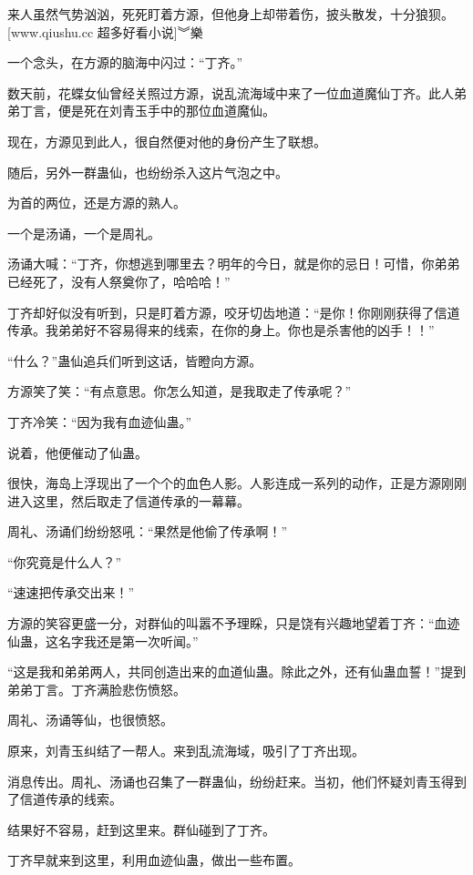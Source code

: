 
\begin{this_body}

来人虽然气势汹汹，死死盯着方源，但他身上却带着伤，披头散发，十分狼狈。[www.qiushu.cc 超多好看小说]︾樂

一个念头，在方源的脑海中闪过：“丁齐。”

数天前，花蝶女仙曾经关照过方源，说乱流海域中来了一位血道魔仙丁齐。此人弟弟丁言，便是死在刘青玉手中的那位血道魔仙。

现在，方源见到此人，很自然便对他的身份产生了联想。

随后，另外一群蛊仙，也纷纷杀入这片气泡之中。

为首的两位，还是方源的熟人。

一个是汤诵，一个是周礼。

汤诵大喊：“丁齐，你想逃到哪里去？明年的今日，就是你的忌日！可惜，你弟弟已经死了，没有人祭奠你了，哈哈哈！”

丁齐却好似没有听到，只是盯着方源，咬牙切齿地道：“是你！你刚刚获得了信道传承。我弟弟好不容易得来的线索，在你的身上。你也是杀害他的凶手！！”

“什么？”蛊仙追兵们听到这话，皆瞪向方源。

方源笑了笑：“有点意思。你怎么知道，是我取走了传承呢？”

丁齐冷笑：“因为我有血迹仙蛊。”

说着，他便催动了仙蛊。

很快，海岛上浮现出了一个个的血色人影。人影连成一系列的动作，正是方源刚刚进入这里，然后取走了信道传承的一幕幕。

周礼、汤诵们纷纷怒吼：“果然是他偷了传承啊！”

“你究竟是什么人？”

“速速把传承交出来！”

方源的笑容更盛一分，对群仙的叫嚣不予理睬，只是饶有兴趣地望着丁齐：“血迹仙蛊，这名字我还是第一次听闻。”

“这是我和弟弟两人，共同创造出来的血道仙蛊。除此之外，还有仙蛊血誓！”提到弟弟丁言。丁齐满脸悲伤愤怒。

周礼、汤诵等仙，也很愤怒。

原来，刘青玉纠结了一帮人。来到乱流海域，吸引了丁齐出现。

消息传出。周礼、汤诵也召集了一群蛊仙，纷纷赶来。当初，他们怀疑刘青玉得到了信道传承的线索。

结果好不容易，赶到这里来。群仙碰到了丁齐。

丁齐早就来到这里，利用血迹仙蛊，做出一些布置。


\end{this_body}
